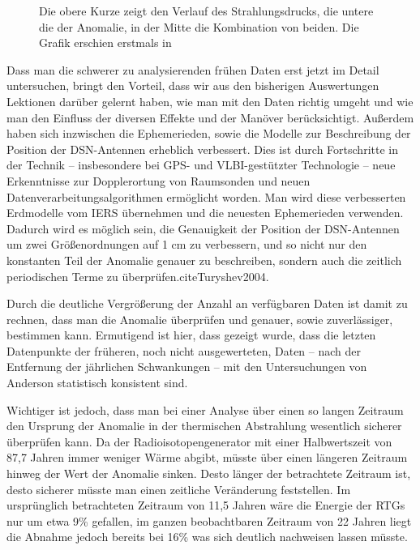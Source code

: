 \begin{figure}[htnb]
\begin{center}
\noindent    
{}
\end{center}
\vskip -10pt
  \caption{
Die obere Kurze zeigt den Verlauf des Strahlungsdrucks, die untere die der Anomalie, in der Mitte die Kombination von beiden. Die Grafik erschien erstmals in \cite{Anderson1992}}
\label{fig:forces}
\end{figure} 


Dass man die schwerer zu analysierenden frühen Daten erst jetzt im Detail untersuchen, bringt den Vorteil, dass wir aus den bisherigen Auswertungen Lektionen darüber gelernt haben, wie man mit den Daten richtig umgeht und wie man den Einfluss der diversen Effekte und der Manöver berücksichtigt\cite{Nieto2005}.
Außerdem haben sich inzwischen die Ephemerieden, sowie die Modelle zur Beschreibung der Position der DSN-Antennen erheblich verbessert. Dies ist durch Fortschritte in der Technik – insbesondere bei GPS- und VLBI-gestützter Technologie – neue Erkenntnisse zur Dopplerortung von Raumsonden und neuen Datenverarbeitungsalgorithmen ermöglicht worden.
Man wird diese verbesserten Erdmodelle vom IERS übernehmen und die neuesten Ephemerieden verwenden. Dadurch wird es möglich sein, die Genauigkeit der Position der DSN-Antennen um zwei Größenordnungen auf 1 cm zu verbessern, und so nicht nur den konstanten Teil der Anomalie genauer zu beschreiben, sondern auch die zeitlich periodischen Terme zu überprüfen.cite{Turyshev2004}.

Durch die deutliche Vergrößerung der Anzahl an verfügbaren Daten ist damit zu rechnen, dass man die Anomalie überprüfen und genauer, sowie zuverlässiger, bestimmen kann.
Ermutigend ist hier, dass gezeigt wurde, dass die letzten Datenpunkte der früheren, noch nicht ausgewerteten, Daten – nach der Entfernung der jährlichen Schwankungen – mit den Untersuchungen von Anderson\cite{Anderson2002} statistisch konsistent sind\cite{Nieto2005}.

Wichtiger ist jedoch, dass man bei einer Analyse über einen so langen Zeitraum den Ursprung der Anomalie in der thermischen Abstrahlung wesentlich sicherer überprüfen kann. Da der Radioisotopengenerator mit einer Halbwertszeit von 87,7 Jahren immer weniger Wärme abgibt, müsste über einen längeren Zeitraum hinweg der Wert der Anomalie sinken. Desto länger der betrachtete Zeitraum ist, desto sicherer müsste man einen zeitliche Veränderung feststellen.
Im ursprünglich betrachteten Zeitraum von 11,5 Jahren wäre die Energie der RTGs nur um etwa 9\% gefallen, im ganzen beobachtbaren Zeitraum von 22 Jahren liegt die Abnahme jedoch bereits bei 16\% was sich deutlich nachweisen lassen müsste.


